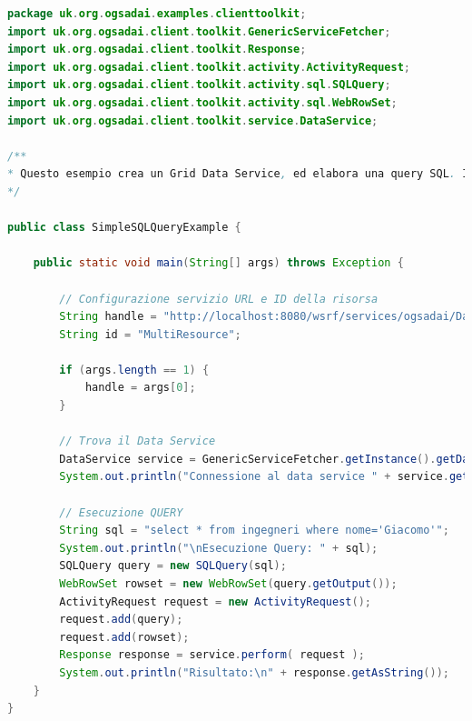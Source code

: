 \documentclass[11pt]{article}
\begin{document}
\begin{lstlisting}[language=java]
package uk.org.ogsadai.examples.clienttoolkit;
import uk.org.ogsadai.client.toolkit.GenericServiceFetcher;
import uk.org.ogsadai.client.toolkit.Response;
import uk.org.ogsadai.client.toolkit.activity.ActivityRequest;
import uk.org.ogsadai.client.toolkit.activity.sql.SQLQuery;
import uk.org.ogsadai.client.toolkit.activity.sql.WebRowSet;
import uk.org.ogsadai.client.toolkit.service.DataService;

/**
* Questo esempio crea un Grid Data Service, ed elabora una query SQL. I risultati sono disponibili all'interno di un Perform Document.
*/

public class SimpleSQLQueryExample {
	
	public static void main(String[] args) throws Exception {
		
		// Configurazione servizio URL e ID della risorsa
		String handle = "http://localhost:8080/wsrf/services/ogsadai/DataService";
		String id = "MultiResource";

		if (args.length == 1) {
			handle = args[0];
		}
		
		// Trova il Data Service
		DataService service = GenericServiceFetcher.getInstance().getDataService(handle, id);
		System.out.println("Connessione al data service " + service.getURL());
		
		// Esecuzione QUERY
		String sql = "select * from ingegneri where nome='Giacomo'";
		System.out.println("\nEsecuzione Query: " + sql);
		SQLQuery query = new SQLQuery(sql);
		WebRowSet rowset = new WebRowSet(query.getOutput());
		ActivityRequest request = new ActivityRequest();
		request.add(query);
		request.add(rowset);
		Response response = service.perform( request );
		System.out.println("Risultato:\n" + response.getAsString());	
	}
}
\end{lstlisting}

\newpage
\end{document}
